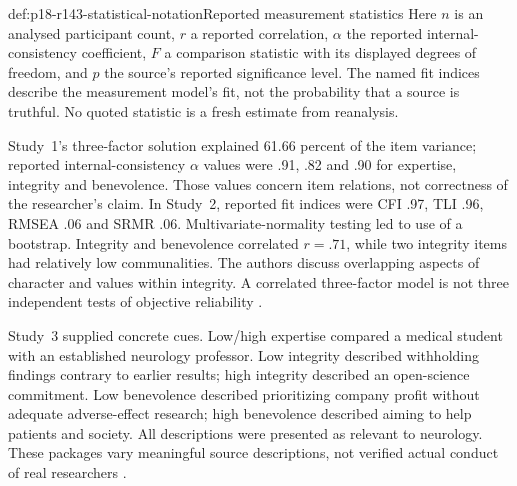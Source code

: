 \begin{hbconvention}{def:p18-r143-statistical-notation}{Reported measurement statistics}
Here \(n\) is an analysed participant count, \(r\) a reported correlation,
\(\alpha\) the reported internal-consistency coefficient, \(F\) a
comparison statistic with its displayed degrees of freedom, and \(p\)
the source's reported significance level. The named fit indices describe
the measurement model's fit, not the probability that a source is truthful.
No quoted statistic is a fresh estimate from reanalysis.
\end{hbconvention}

Study~1's three-factor solution explained 61.66 percent of the item variance;
reported internal-consistency \(\alpha\) values were .91, .82 and .90 for
expertise, integrity and benevolence. Those values concern item relations,
not correctness of the researcher's claim. In Study~2, reported fit indices
were CFI .97, TLI .96, RMSEA .06 and SRMR .06. Multivariate-normality testing
led to use of a bootstrap. Integrity and benevolence correlated
\(r=.71\), while two integrity items had relatively low communalities.
The authors discuss overlapping aspects of character and values within
integrity. A correlated three-factor model is not three independent tests
of objective reliability \cite[pp.~5--9, 16]{HendriksKienhuesBromme2015METI}.

Study~3 supplied concrete cues. Low/high expertise compared a medical
student with an established neurology professor. Low integrity described
withholding findings contrary to earlier results; high integrity described
an open-science commitment. Low benevolence described prioritizing company
profit without adequate adverse-effect research; high benevolence described
aiming to help patients and society. All descriptions were presented as
relevant to neurology. These packages vary meaningful source descriptions,
not verified actual conduct of real researchers
\cite[pp.~9--11, table~5]{HendriksKienhuesBromme2015METI}.

